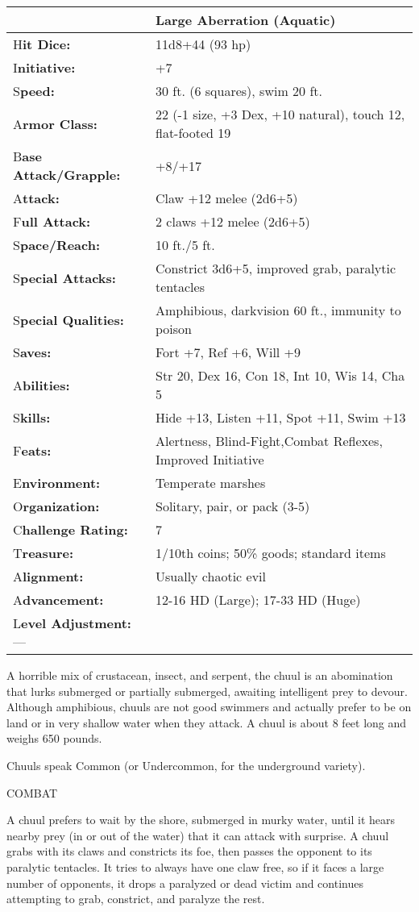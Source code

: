 \documentclass{article}
\begin{document}
\begin{tabular}{|>{\raggedright}p{89pt}|>{\raggedright}p{236pt}|}
\hline
  & Large Aberration (Aquatic)\tabularnewline
\hline
H\textbf{it Dice:} & 11d8+44 (93 hp)\tabularnewline
\hline
I\textbf{nitiative:} & +7\tabularnewline
\hline
S\textbf{peed:} & 30 ft. (6 squares), swim 20 ft.\tabularnewline
\hline
A\textbf{rmor Class:} & 22 (-1 size, +3 Dex, +10 natural), touch 12, flat-footed 
19\tabularnewline
\hline
B\textbf{ase Attack/Grapple:} & +8/+17\tabularnewline
\hline
A\textbf{ttack:} & Claw +12 melee (2d6+5)\tabularnewline
\hline
F\textbf{ull Attack:} & 2 claws +12 melee (2d6+5)\tabularnewline
\hline
S\textbf{pace/Reach:} & 10 ft./5 ft.\tabularnewline
\hline
S\textbf{pecial Attacks:} & Constrict 3d6+5, improved grab, paralytic tentacles\tabularnewline
\hline
S\textbf{pecial Qualities:} & Amphibious, darkvision 60 ft., immunity to poison\tabularnewline
\hline
S\textbf{aves:} & Fort +7, Ref +6, Will +9\tabularnewline
\hline
A\textbf{bilities:} & Str 20, Dex 16, Con 18, Int 10, Wis 14, Cha 5\tabularnewline
\hline
S\textbf{kills:} & Hide +13, Listen +11, Spot +11, Swim +13\tabularnewline
\hline
F\textbf{eats:} & Alertness, Blind-Fight,Combat Reflexes, Improved Initiative\tabularnewline
\hline
E\textbf{nvironment:} & Temperate marshes\tabularnewline
\hline
O\textbf{rganization:} & Solitary, pair, or pack (3-5)\tabularnewline
\hline
C\textbf{hallenge Rating:} & 7\tabularnewline
\hline
T\textbf{reasure:} & 1/10th coins; 50\% goods; standard items\tabularnewline
\hline
A\textbf{lignment:} & Usually chaotic evil\tabularnewline
\hline
A\textbf{dvancement:} & 12-16 HD (Large); 17-33 HD (Huge)\tabularnewline
\hline
L\textbf{evel Adjustment:}--- & \tabularnewline
\hline
\end{tabular}

A horrible mix of crustacean, insect, and serpent, the chuul is an abomination 
that lurks submerged or partially submerged, awaiting intelligent prey to devour. 
Although amphibious, chuuls are not good swimmers and actually prefer to be on 
land or in very shallow water when they attack. A chuul is about 8 feet long and 
weighs 650 pounds.

Chuuls speak Common (or Undercommon, for the underground variety).

COMBAT

A chuul prefers to wait by the shore, submerged in murky water, until it hears 
nearby prey (in or out of the water) that it can attack with surprise. A chuul 
grabs with its claws and constricts its foe, then passes the opponent to its paralytic 
tentacles. It tries to always have one claw free, so if it faces a large number 
of opponents, it drops a paralyzed or dead victim and continues attempting to grab, 
constrict, and paralyze the rest.
\end{document}
